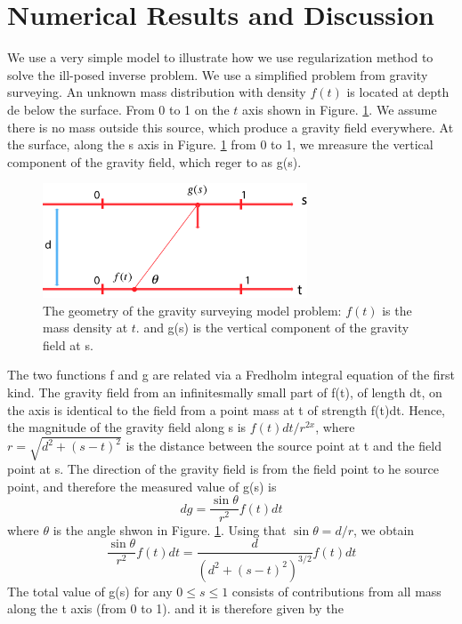 \documentclass{article}
\begin{document}
\section{Numerical Results and Discussion}
We use a very simple model to illustrate how we use regularization method to
solve the ill-posed inverse problem. We use a simplified problem from gravity
surveying. An unknown mass distribution with density \(f(t)\) is located at
depth de below the surface. From 0 to 1 on the \(t\) axis shown in
Figure. \ref{fig:GeophysicsIllustrator}. We assume there is no mass outside
this source, which produce a gravity field everywhere. At the surface, along the
s axis in Figure. \ref{fig:GeophysicsIllustrator} from 0 to 1, we mreasure the
vertical component of the gravity field, which reger to as g(s).
 
 \begin{figure}[h!]
  \centering
    \includegraphics[width=0.7\textwidth]{images/GeophysicsIllustrator/illustrator}
  \caption{The geometry of the gravity surveying model problem: \(f(t)\) is the
  mass density at \(t\). and g(s) is the vertical component of the gravity
  field at s.}
  \label{fig:GeophysicsIllustrator}
\end{figure}
The two functions f and g are related via a Fredholm integral equation of the
first kind. The gravity field from an infinitesmally small part of f(t), of
length dt, on the axis is identical to the field from a point mass at t of
strength f(t)dt. Hence, the magnitude of the gravity field along s is
\(f(t)dt/{r^{2x}}\), where \(r = \sqrt {{d^2} + {{(s - t)}^2}} \) is the
distance between the source point at t and the field point at s. The direction
of the gravity field is from the field point to  he source point, and therefore
the measured value of g(s) is
\[dg = \frac{{\sin \theta }}{{{r^2}}}f(t)dt\]
where \(\theta \) is the angle shwon in Figure. \ref{fig:GeophysicsIllustrator}.
Using that \(\sin \theta  = d/r\), we obtain
\[\frac{{\sin \theta }}{{{r^2}}}f(t)dt = \frac{d}{{{{({d^2} + {{(s -
t)}^2})}^{3/2}}}}f(t)dt\]
The total value of g(s) for any \(0 \le s \le 1\) consists of contributions from
all mass along the t axis (from 0 to 1). and it is therefore given by the
\end{document}
